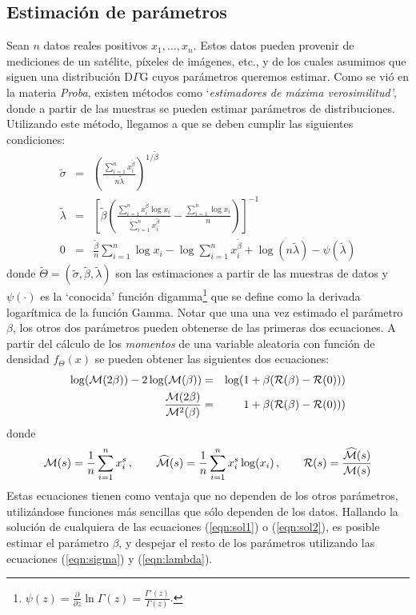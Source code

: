 \documentclass[a4paper,10pt,twoside]{article}
\begin{document}
\subsection{Estimaci\'on de par\'ametros}

Sean $n$ datos reales positivos $x_1,\dots,x_n$. Estos datos pueden provenir de mediciones de un sat\'elite, p\'ixeles de im\'agenes, etc., y de los cuales asumimos que siguen una distribuci\'on D$\Gamma$G cuyos par\'ametros queremos estimar. Como se vi\'o en la materia \emph{Proba}, existen m\'etodos como `\textsl{estimadores de m\'axima verosimilitud'}, donde a partir de las muestras se pueden estimar par\'ametros de distribuciones. Utilizando este m\'etodo, llegamos a que se deben cumplir las siguientes condiciones:
\begin{eqnarray}
\tilde{\sigma} & = & \left(\frac{\sum_{i=1}^n{x_i^{\tilde{\beta}}}}{n \tilde{\lambda}} \right)^{1/\tilde{\beta}} \label{eqn:sigma}\\
\tilde{\lambda} & = &\left[ \tilde{\beta} \left( \frac{\sum_{i=1}^n{x_i^{\tilde{\beta}} \log x_i}}{\sum_{i=1}^n{x_i^{\tilde{\beta}}}} - \frac{\sum_{i=1}^n{\log x_i}}{n} \right)\right]^{-1} \label{eqn:lambda}\\
 0 & = & \frac{\tilde{\beta}}{n} \sum_{i=1}^n{\log x_i} - \log {\sum_{i=1}^n{x_i^{\tilde{\beta}}}} + \log(n \tilde{\lambda}) - \psi(\tilde{\lambda})
\end{eqnarray}
donde $\tilde{\Theta}=(\tilde{\sigma},\tilde{\beta},\tilde{\lambda})$ son las estimaciones a partir de las muestras de datos y $\psi(\cdot)$ es la `conocida' funci\'on digamma\footnote{$\psi(z) = \frac{\partial}{\partial z} \ln \Gamma (z) = \frac{\Gamma'(z)}{\Gamma(z)}$.} que se define como la derivada logar\'itmica de la funci\'on Gamma. Notar que una una vez estimado el par\'ametro $\beta$, los otros dos par\'ametros pueden obtenerse de las primeras dos ecuaciones. A partir del c\'alculo de los \textsl{momentos} de una variable aleatoria con funci\'on de densidad $f_\Theta(x)$ se pueden obtener las siguientes dos ecuaciones:
\begin{eqnarray}
\log(\mathcal{M}(2\beta)) -2\log(\mathcal{M}(\beta)) & = & \log(1+\beta(\mathcal{R}(\beta)-\mathcal{R}(0))) \label{eqn:sol1}\\
\frac{\mathcal{M}(2\beta)}{\mathcal{M}^2(\beta)} & = & 1+\beta(\mathcal{R}(\beta)-\mathcal{R}(0))) \label{eqn:sol2}
\end{eqnarray}
donde 
$$\mathcal{M}(s) =  \frac{1}{n}\sum_{i=1}^n{x_i^s}\,, \qquad \widehat{\mathcal{M}}(s) = \frac{1}{n}\sum_{i=1}^n{x_i^s \log(x_i)}\,,  \qquad \mathcal{R}(s) = \frac{\widehat{\mathcal{M}}(s)}{\mathcal{M}(s)}$$
Estas ecuaciones tienen como ventaja que no dependen de los otros par\'ametros, utiliz\'andose funciones m\'as sencillas que s\'olo dependen de los datos. Hallando la soluci\'on de cualquiera de las ecuaciones (\ref{eqn:sol1}) o (\ref{eqn:sol2}), es posible estimar el par\'ametro $\beta$, y despejar el resto de los par\'ametros utilizando las ecuaciones (\ref{eqn:sigma}) y (\ref{eqn:lambda}).
\end{document}
